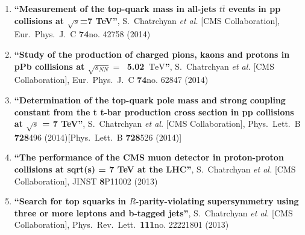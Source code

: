\begin{enumerate}
\item%
{\bf ``Measurement of the top-quark mass in all-jets $t\bar{t}$ events in pp collisions at $\sqrt{s}$=7 TeV''}, 
  S.~Chatrchyan {\it et al.}  [CMS Collaboration], 
Eur.\ Phys.\ J.\ C {\bf 74}no. 42758 (2014) %


\item%
{\bf ``Study of the production of charged pions, kaons and protons in pPb collisions at $\sqrt{s_{NN}} =\  $ 5.02 $\,\text {TeV}$''}, 
  S.~Chatrchyan {\it et al.}  [CMS Collaboration], 
Eur.\ Phys.\ J.\ C {\bf 74}no. 62847 (2014) %


\item%
{\bf ``Determination of the top-quark pole mass and strong coupling constant from the t t-bar production cross section in pp collisions at $\sqrt{s}$ = 7 TeV''}, 
  S.~Chatrchyan {\it et al.}  [CMS Collaboration], 
Phys.\ Lett.\ B {\bf 728}496 (2014)[Phys.\ Lett.\ B {\bf 728}526 (2014)] %


\item%
{\bf ``The performance of the CMS muon detector in proton-proton collisions at sqrt(s) = 7 TeV at the LHC''}, 
  S.~Chatrchyan {\it et al.}  [CMS Collaboration], 
JINST {\bf 8}P11002 (2013) %


\item%
{\bf ``Search for top squarks in $R$-parity-violating supersymmetry using three or more leptons and b-tagged jets''}, 
  S.~Chatrchyan {\it et al.}  [CMS Collaboration], 
Phys.\ Rev.\ Lett.\  {\bf 111}no. 22221801 (2013) %



\end{enumerate}
